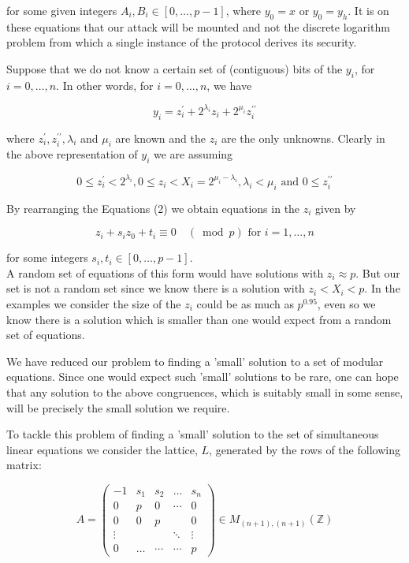 \documentclass[10pt]{article}
\begin{document}
for some given integers $A_{i}, B_{i} \in[0, \ldots, p-1]$, where $y_{0}=x$ or $y_{0}=y_{h}$. It is on these equations that our attack will be mounted and not the discrete logarithm problem from which a single instance of the protocol derives its security.

Suppose that we do not know a certain set of (contiguous) bits of the $y_{i}$, for $i=0, \ldots, n$. In other words, for $i=0, \ldots, n$, we have

$$
y_{i}=z_{i}^{\prime}+2^{\lambda_{i}} z_{i}+2^{\mu_{i}} z_{i}^{\prime \prime}
$$

where $z_{i}^{\prime}, z_{i}^{\prime \prime}, \lambda_{i}$ and $\mu_{i}$ are known and the $z_{i}$ are the only unknowns. Clearly in the above representation of $y_{i}$ we are assuming

$$
0 \leq z_{i}^{\prime}<2^{\lambda_{i}}, 0 \leq z_{i}<X_{i}=2^{\mu_{i}-\lambda_{i}}, \lambda_{i}<\mu_{i} \text { and } 0 \leq z_{i}^{\prime \prime}
$$

By rearranging the Equations (2) we obtain equations in the $z_{i}$ given by


\begin{equation*}
z_{i}+s_{i} z_{0}+t_{i} \equiv 0 \quad(\bmod p) \text { for } i=1, \ldots, n \tag{3}
\end{equation*}


for some integers $s_{i}, t_{i} \in[0, \ldots, p-1]$.\\
A random set of equations of this form would have solutions with $z_{i} \approx p$. But our set is not a random set since we know there is a solution with $z_{i}<X_{i}<p$. In the examples we consider the size of the $z_{i}$ could be as much as $p^{0.95}$, even so we know there is a solution which is smaller than one would expect from a random set of equations.

We have reduced our problem to finding a 'small' solution to a set of modular equations. Since one would expect such 'small' solutions to be rare, one can hope\\
that any solution to the above congruences, which is suitably small in some sense, will be precisely the small solution we require.

To tackle this problem of finding a 'small' solution to the set of simultaneous linear equations we consider the lattice, $L$, generated by the rows of the following matrix:

$$
A=\left(\begin{array}{ccccc}
-1 & s_{1} & s_{2} & \ldots & s_{n} \\
0 & p & 0 & \cdots & 0 \\
0 & 0 & p & & 0 \\
\vdots & & & \ddots & \vdots \\
0 & \ldots & \cdots & \cdots & p
\end{array}\right) \in M_{(n+1),(n+1)}(\mathbb{Z})
$$
\end{document}
